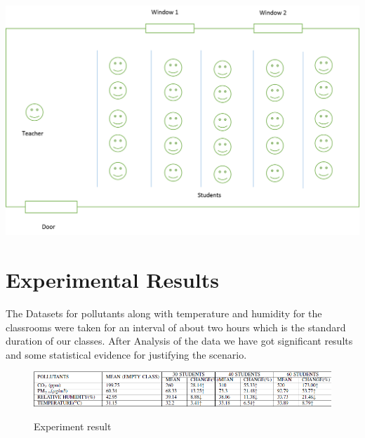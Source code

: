 \includegraphics[width=1.0\textwidth]{./class}\\[0.1in]
\label{Classroom monitoring}

\section{Experimental Results}
The Datasets for pollutants along with temperature and humidity for the classrooms were taken for an interval of about two hours which is the standard duration of our classes. After Analysis of the data we have got significant results and some statistical evidence for justifying the scenario.
\begin{figure}
\centering
\includegraphics[width=1.0\textwidth]{./table}\\[0.1in]
\label{fig:Experimental result}
\caption{Experiment result}
\end{figure}


